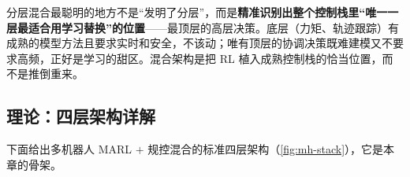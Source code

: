 \begin{insight}
分层混合最聪明的地方不是“发明了分层”，而是\textbf{精准识别出整个控制栈里“唯一一层最适合用学习替换”的位置}——最顶层的高层决策。底层（力矩、轨迹跟踪）有成熟的模型方法且要求实时和安全，不该动；唯有顶层的协调决策既难建模又不要求高频，正好是学习的甜区。混合架构是把 RL 植入成熟控制栈的恰当位置，而不是推倒重来。
\end{insight}

\subsection{理论：四层架构详解}
\label{sec:mh-four-levels}

下面给出多机器人 MARL $+$ 规控混合的标准四层架构（\cref{fig:mh-stack}），它是本章的骨架。

